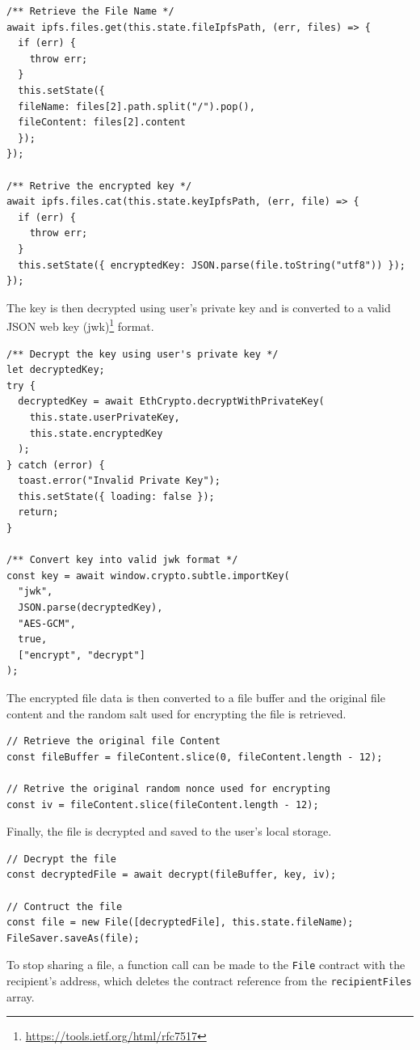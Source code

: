 \documentclass[]{article}
\begin{document}
\begin{verbatim}
/** Retrieve the File Name */
await ipfs.files.get(this.state.fileIpfsPath, (err, files) => {
  if (err) {
    throw err;
  }
  this.setState({
  fileName: files[2].path.split("/").pop(),
  fileContent: files[2].content
  });
});

/** Retrive the encrypted key */
await ipfs.files.cat(this.state.keyIpfsPath, (err, file) => {
  if (err) {
    throw err;
  }
  this.setState({ encryptedKey: JSON.parse(file.toString("utf8")) });
});
\end{verbatim}
		
		The key is then decrypted using user's private key and is converted to a valid JSON web key (jwk)\footnote{\url{https://tools.ietf.org/html/rfc7517}} format.
		
\begin{verbatim}
/** Decrypt the key using user's private key */
let decryptedKey;
try {
  decryptedKey = await EthCrypto.decryptWithPrivateKey(
    this.state.userPrivateKey,
    this.state.encryptedKey
  );
} catch (error) {
  toast.error("Invalid Private Key");
  this.setState({ loading: false });
  return;
}

/** Convert key into valid jwk format */
const key = await window.crypto.subtle.importKey(
  "jwk",
  JSON.parse(decryptedKey),
  "AES-GCM",
  true,
  ["encrypt", "decrypt"]
);
\end{verbatim}

		The encrypted file data is then converted to a file buffer and the original file content and the random salt used for encrypting the file is retrieved.
		
\begin{verbatim}
// Retrieve the original file Content
const fileBuffer = fileContent.slice(0, fileContent.length - 12);

// Retrive the original random nonce used for encrypting
const iv = fileContent.slice(fileContent.length - 12);
\end{verbatim}

		Finally, the file is decrypted and saved to the user's local storage.
		
\begin{verbatim}
// Decrypt the file
const decryptedFile = await decrypt(fileBuffer, key, iv);

// Contruct the file
const file = new File([decryptedFile], this.state.fileName);
FileSaver.saveAs(file);
\end{verbatim}

		To stop sharing a file, a function call can be made to the \texttt{File} contract with the recipient's address, which deletes the contract reference from the \texttt{recipientFiles} array.
		
\end{document}
